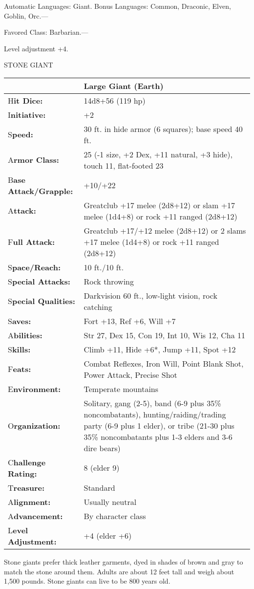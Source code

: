 \documentclass{article}
\begin{document}
Automatic Languages: Giant. Bonus Languages: Common, Draconic, Elven, Goblin, Orc.---

Favored Class: Barbarian.---

Level adjustment +4.

\vspace{12pt}
STONE GIANT

\begin{tabular}{|>{\raggedright}p{83pt}|>{\raggedright}p{243pt}|}
\hline
  & Large Giant (Earth)\tabularnewline
\hline
H\textbf{it Dice:} & 14d8+56 (119 hp)\tabularnewline
\hline
I\textbf{nitiative:} & +2\tabularnewline
\hline
S\textbf{peed:} & 30 ft. in hide armor (6 squares); base speed 40 ft.\tabularnewline
\hline
A\textbf{rmor Class:} & 25 (-1 size, +2 Dex, +11 natural, +3 hide), touch 11, flat-footed 
23\tabularnewline
\hline
B\textbf{ase Attack/Grapple:} & +10/+22\tabularnewline
\hline
A\textbf{ttack:} & Greatclub +17 melee (2d8+12) or slam +17 melee (1d4+8) or rock 
+11 ranged (2d8+12)\tabularnewline
\hline
F\textbf{ull Attack:} & Greatclub +17/+12 melee (2d8+12) or 2 slams +17 melee (1d4+8) 
or rock +11 ranged (2d8+12)\tabularnewline
\hline
S\textbf{pace/Reach:} & 10 ft./10 ft.\tabularnewline
\hline
S\textbf{pecial Attacks:} & Rock throwing\tabularnewline
\hline
S\textbf{pecial Qualities:} & Darkvision 60 ft., low-light vision, rock catching\tabularnewline
\hline
S\textbf{aves:} & Fort +13, Ref +6, Will +7\tabularnewline
\hline
A\textbf{bilities:} & Str 27, Dex 15, Con 19, Int 10, Wis 12, Cha 11\tabularnewline
\hline
S\textbf{kills:} & Climb +11, Hide +6*, Jump +11, Spot +12\tabularnewline
\hline
F\textbf{eats:} & Combat Reflexes, Iron Will, Point Blank Shot, Power Attack, Precise 
Shot\tabularnewline
\hline
E\textbf{nvironment:} & Temperate mountains\tabularnewline
\hline
O\textbf{rganization:} & Solitary, gang (2-5), band (6-9 plus 35\% noncombatants), 
hunting/raiding/trading party (6-9 plus 1 elder), or tribe (21-30 plus 35\% noncombatants 
plus 1-3 elders and 3-6 dire bears)\tabularnewline
\hline
C\textbf{hallenge Rating:} & 8 (elder 9)\tabularnewline
\hline
T\textbf{reasure:} & Standard\tabularnewline
\hline
A\textbf{lignment:} & Usually neutral\tabularnewline
\hline
A\textbf{dvancement:} & By character class\tabularnewline
\hline
L\textbf{evel Adjustment:} & +4 (elder +6)\tabularnewline
\hline
\end{tabular}

Stone giants prefer thick leather garments, dyed in shades of brown and gray to 
match the stone around them. Adults are about 12 feet tall and weigh about 1,500 
pounds. Stone giants can live to be 800 years old.
\end{document}
